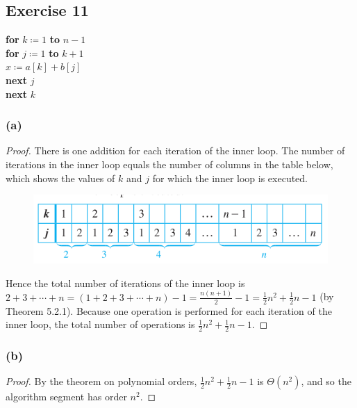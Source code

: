 \documentclass[14pt]{extarticle}
\begin{document}
\subsection{Exercise 11}
\begin{tabbing}
{\bf for} \= \(k \coloneqq 1\) {\bf to} \(n-1\) \\
          \> {\bf for} \= \(j \coloneqq 1\) {\bf to} \(k+1\)\\
          \>           \> \(x \coloneqq a[k] + b[j]\) \\
          \> {\bf next} \(j\) \\
{\bf next} \(k\)
\end{tabbing}

\subsubsection{(a)}
\begin{proof}
There is one addition for each iteration of the inner loop. The number of iterations in the inner loop equals the number 
of columns in the table below, which shows the values of \(k\) and \(j\) for which the inner loop is executed.

\begin{figure}[ht!]
\centering
\includegraphics[scale=0.5]{../images/11.3.11.a.png}
\end{figure}

Hence the total number of iterations of the inner loop is \(2+3+\cdots+n = (1+2+3+\cdots+n) - 1 = \frac{n(n+1)}{2} - 1 = 
\frac{1}{2}n^2 + \frac{1}{2}n - 1\) (by Theorem 5.2.1). Because one operation is performed for each iteration of the 
inner loop, the total number of operations is \(\frac{1}{2}n^2 + \frac{1}{2}n - 1\).
\end{proof}

\subsubsection{(b)}
\begin{proof}
By the theorem on polynomial orders, \(\frac{1}{2}n^2 + \frac{1}{2}n - 1\) is \(\Theta(n^2)\), and so the algorithm 
segment has order \(n^2\).
\end{proof}
\end{document}
